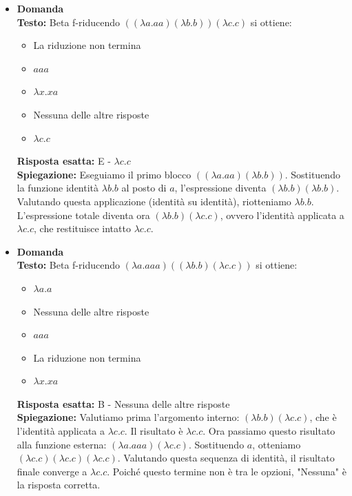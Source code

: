 \documentclass[12pt, a4paper]{article}
\newcounter{domandateoria}
\begin{document}
\begin{itemize}
    \item {}\textbf{Domanda \thedomandateoria} \\
    \textbf{Testo:} Beta f-riducendo $((\lambda a.a a)(\lambda b.b))(\lambda c.c)$ si ottiene:
    \begin{itemize}
        \item[A)] La riduzione non termina
        \item[B)] $a a a$
        \item[C)] $\lambda x.x a$
        \item[D)] Nessuna delle altre risposte
        \item[E)] $\lambda c.c$
    \end{itemize}
    \textbf{Risposta esatta:} E - $\lambda c.c$ \\
    \textbf{Spiegazione:} Eseguiamo il primo blocco $((\lambda a.a a)(\lambda b.b))$. Sostituendo la funzione identità $\lambda b.b$ al posto di $a$, l'espressione diventa $(\lambda b.b)(\lambda b.b)$. Valutando questa applicazione (identità su identità), riotteniamo $\lambda b.b$. L'espressione totale diventa ora $(\lambda b.b)(\lambda c.c)$, ovvero l'identità applicata a $\lambda c.c$, che restituisce intatto $\lambda c.c$.
    \vspace{0.3cm}

    \item {}\textbf{Domanda \thedomandateoria} \\
    \textbf{Testo:} Beta f-riducendo $(\lambda a.a a a)((\lambda b.b) (\lambda c.c))$ si ottiene:
    \begin{itemize}
        \item[A)] $\lambda a.a$
        \item[B)] Nessuna delle altre risposte
        \item[C)] $a a a$
        \item[D)] La riduzione non termina
        \item[E)] $\lambda x.x a$
    \end{itemize}
    \textbf{Risposta esatta:} B - Nessuna delle altre risposte \\
    \textbf{Spiegazione:} Valutiamo prima l'argomento interno: $(\lambda b.b)(\lambda c.c)$, che è l'identità applicata a $\lambda c.c$. Il risultato è $\lambda c.c$. Ora passiamo questo risultato alla funzione esterna: $(\lambda a.a a a)(\lambda c.c)$. Sostituendo $a$, otteniamo $(\lambda c.c)(\lambda c.c)(\lambda c.c)$. Valutando questa sequenza di identità, il risultato finale converge a $\lambda c.c$. Poiché questo termine non è tra le opzioni, "Nessuna" è la risposta corretta.
    \vspace{0.3cm}


\end{itemize}
\end{document}
